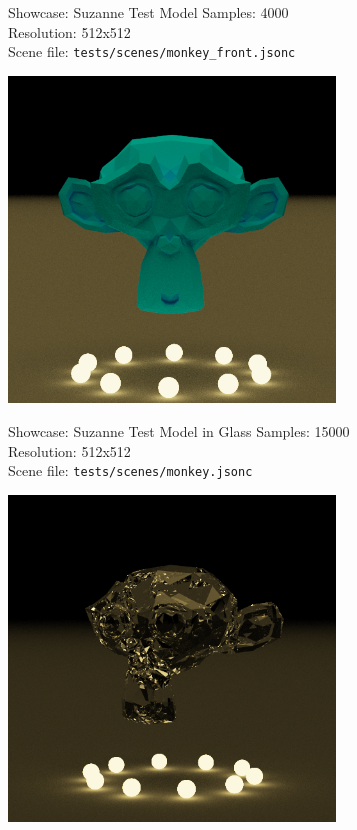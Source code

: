 \documentclass{beamer}
\begin{document}
\begin{frame}{Showcase: Suzanne Test Model}
    \footnotesize{
    Samples: 4000\\
    Resolution: 512x512\\
    Scene file: \texttt{tests/scenes/monkey\_front.jsonc}
    }
    \begin{center}
        \includegraphics[width=0.65\textwidth]{../img/suzanne_blue.png}
    \end{center}
\end{frame}

\begin{frame}{Showcase: Suzanne Test Model in Glass}
    \footnotesize{
    Samples: 15000\\
    Resolution: 512x512\\
    Scene file: \texttt{tests/scenes/monkey.jsonc}
    }
    \begin{center}
        \includegraphics[width=0.65\textwidth]{../img/suzanne_glass.png}
    \end{center}
\end{frame}
\end{document}
